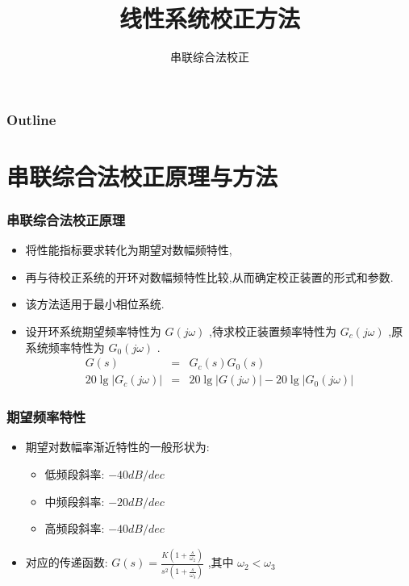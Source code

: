 \documentclass[table]{beamer}
\subtitle{串联综合法校正}
\title{线性系统校正方法}
\author{}
\date{}
\begin{document}
\maketitle

\begin{frame}
\frametitle{Outline}
\setcounter{tocdepth}{3}
\tableofcontents
\end{frame}













\section{串联综合法校正原理与方法}
\label{sec-1}
\begin{frame}
\frametitle{串联综合法校正原理}
\label{sec-1-1}

\begin{itemize}
\item <2->将性能指标要求转化为期望对数幅频特性,
\item <3->再与待校正系统的开环对数幅频特性比较,从而确定校正装置的形式和参数.
\item <4->该方法适用于最小相位系统.
\item <5->设开环系统期望频率特性为 $G(j\omega)$ ,待求校正装置频率特性为 $G_c(j\omega)$ ,原系统频率特性为 $G_0(j\omega)$ .
     \begin{eqnarray*}
     G(s) &= &G_c(s)G_0(s) \\
     20\lg|G_c(j\omega)| &=& 20\lg|G(j\omega)|-20\lg|G_0(j\omega)|
     \end{eqnarray*}
\end{itemize}
\end{frame}
\begin{frame}
\frametitle{期望频率特性}
\label{sec-1-2}

\begin{itemize}
\item 期望对数幅率渐近特性的一般形状为:
\begin{itemize}
\item 低频段斜率: $-40 dB/dec$
\item 中频段斜率: $-20 dB/dec$
\item 高频段斜率: $-40 dB/dec$
\end{itemize}
\item <2->对应的传递函数:  $G(s)=\frac{K(1+\frac{s}{\omega_2})}{s^2(1+\frac{s}{\omega_3})}$ ,其中 $\omega_2<\omega_3$
\end{itemize}
\end{frame}
\end{document}
